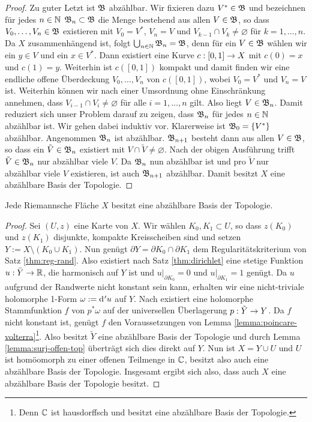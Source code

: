 \begin{proof}
  Zu guter Letzt ist $\mathfrak{B}$ abzählbar. 
  Wir fixieren dazu $V^\ast \in \mathfrak{B}$ und bezeichnen für jedes $n \in \mathbb{N}$
  $\mathfrak{B}_n \subset \mathfrak{B}$ die Menge bestehend aus allen $V \in \mathfrak{B}$, so
  dass $V_0, \dots, V_n \in \mathfrak{B}$ existieren mit $V_0 = V^\ast$, $V_n = V$ und $V_{k-1}
  \cap V_k \neq \varnothing$ für $k = 1, \dots, n$. 
  Da $X$ zusammenhängend ist, folgt $\bigcup_{n \in \mathbb{N}} \mathfrak{B}_n =
  \mathfrak{B}$, denn für ein $V \in \mathfrak{B}$ wählen wir ein $y \in V$ und ein $x
  \in V^\ast$. Dann existiert eine Kurve $c: [0,1] \rightarrow X$ mit $c(0)
  = x$ und $c(1) = y$. Weiterhin ist $c([0,1])$ kompakt und damit
  finden wir eine endliche offene Überdeckung $V_0, \dots, V_n$ von
  $c([0,1])$, wobei $V_0 = V^\ast$ und $V_n = V$ ist. Weiterhin
  können wir nach einer Umsordnung ohne Einschränkung annehmen,
  dass $V_{i-1} \cap V_{i} \neq \varnothing$ für alle $i= 1, \dots,
  n$ gilt. Also liegt $V \in \mathfrak{B}_n$.
  Damit reduziert sich unser Problem darauf zu zeigen, dass $\mathfrak{B}_n$
  für jedes $n \in \mathbb{N}$ abzählbar ist. Wir gehen dabei induktiv vor.
  Klarerweise ist $\mathfrak{B}_0 = \{V^\ast\}$ abzählbar. Angenommen $\mathfrak{B}_n$
  ist abzählbar. $\mathfrak{B}_{n+1}$ besteht dann aus allen $V \in \mathfrak{B}$, so
  dass ein $\tilde V \in \mathfrak{B}_n$ existiert mit $V \cap \tilde V \neq
  \varnothing$. Nach der obigen Ausführung trifft $\tilde V \in \mathfrak{B}_n$
  nur abzählbar viele $V$. Da $\mathfrak{B}_n$ nun abzählbar ist und pro
  $\tilde V$ nur abzählbar viele $V$ existieren, ist auch $\mathfrak{B}_{n+1}$
  abzählbar. Damit besitzt $X$ eine abzählbare Basis der Topologie.
\end{proof}

\begin{thm}[Rad\'o]
  Jede Riemannsche Fläche $X$ besitzt eine abzählbare Basis der
  Topologie.
  \label{thm:rado}
\end{thm}

\begin{proof}
  Sei $(U,z)$ eine Karte von $X$. Wir wählen $K_0, K_1 \subset
  U$, so dass $z(K_0)$ und $z(K_1)$ disjunkte, kompakte Kreisscheiben
  sind und setzen $Y := X \setminus (K_0 \cup K_1)$. 
  Nun genügt $\partial Y = \partial K_0 \cap \partial K_1$ dem
  Regularitätskriterium von Satz \ref{thm:reg-rand}. Also existiert
  nach Satz \ref{thm:dirichlet} eine stetige
  Funktion $u: \bar Y \rightarrow \mathbb{R}$, die harmonisch auf $Y$ ist und
  $u|_{\partial K_0} = 0$ und $u|_{\partial K_1} = 1$
  genügt. Da $u$ aufgrund der Randwerte nicht konstant sein kann, erhalten wir
  eine nicht-triviale holomorphe 1-Form $\omega := \d['u]$ auf $Y$. 
  Nach \cite[Kor. 10.6]{For} existiert eine holomorphe Stammfunktion
  $f$ von $p^\ast\omega$ auf der universellen Überlagerung $p: \tilde
  Y \rightarrow Y$. Da $f$ nicht konstant ist, genügt $f$ den Voraussetzungen von
  Lemma \ref{lemma:poincare-volterra}\footnote{Denn $\mathbb{C}$ ist hausdorffsch
  und besitzt eine abzählbare Basis der Topologie.}. Also besitzt
  $\tilde Y$ eine abzählbare Basis der Topologie und durch
  Lemma \ref{lemma:surj-offen-top} überträgt sich dies direkt auf
  $Y$. Nun ist $X = Y \cup U$ und $U$ ist homöomorph
  zu einer offenen Teilmenge in $\mathbb{C}$, besitzt also auch eine
  abzählbare Basis der Topologie. 
  Insgesamt ergibt sich also, dass auch $X$ eine abzählbare Basis der
  Topologie besitzt.
\end{proof}

